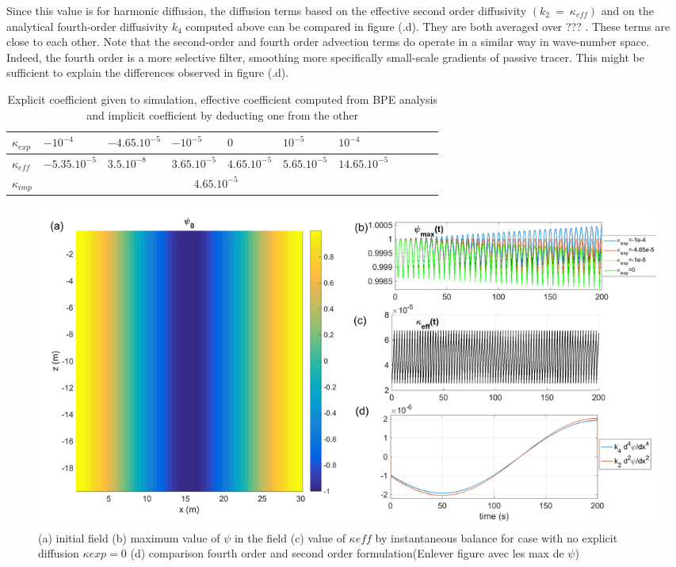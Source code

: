 Since this value is for harmonic diffusion, the diffusion terms based on the effective second order diffusivity $(k_2\ =\ \kappa_{eff})$ and on the analytical fourth-order diffusivity $k_4$ computed above can be compared in figure (.d). They are both averaged over \color{red} ??? \color{black}. These terms are close to each other. Note that the second-order and fourth order advection terms do operate in a similar way in wave-number space. Indeed, the fourth order is a more selective filter, smoothing more specifically small-scale gradients of passive tracer. This might be sufficient to explain the differences observed in figure (.d).

\begin{table}[h!]
\label{table_kappa}
\centering
\begin{tabular}{|l|l|l|l|l|l|l|l|l|l|l|}
\hline
$\kappa_{exp}$ & $-10^{-4}$ &$-4.65.10^{-5}$ & $-10^{-5}$& $0$& $10^{-5}$& $10^{-4}$\\
\hline
$\kappa_{eff}$ & $-5.35.10^{-5}$ &$3.5.10^{-8}$ & $3.65.10^{-5}$& $4.65.10^{-5}$& $5.65.10^{-5}$& $14.65.10^{-5}$\\
\hline
$\kappa_{imp}$&\multicolumn{6}{c|}{$4.65.10^{-5}$}\\
\hline
\end{tabular}
\caption{Explicit coefficient given to simulation, effective coefficient computed from BPE analysis and implicit coefficient by deducting one from the other}
\end{table}

\begin{figure}[h!]
\centering
\includegraphics[width=1\textwidth]{./CHAP_BPE/AGBPE_numlab5.png}
\caption{(a) initial field  (b) maximum value of $\psi$ in the field  (c) value of $\kappa{eff}$ by instantaneous balance for case with no explicit diffusion $\kappa{exp}=0$ (d) comparison fourth order and second order formulation\color{red}(Enlever figure avec les max de $\psi$)\color{black}}
\label{fig5numlab}
\end{figure}

